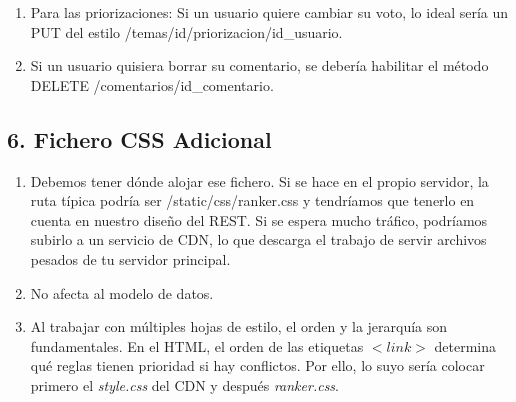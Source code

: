 \begin{enumerate}
  \item Para las priorizaciones: Si un usuario quiere cambiar su voto, lo ideal sería un PUT del estilo /temas/{id}/priorizacion/{id\_usuario}.
  \item Si un usuario quisiera borrar su comentario, se debería habilitar el método DELETE /comentarios/{id\_comentario}.
\end{enumerate}


\subsection*{6. Fichero CSS Adicional}

\begin{enumerate}
  \item Debemos tener dónde alojar ese fichero. Si se hace en el propio servidor, la ruta típica podría ser /static/css/ranker.css y tendríamos que tenerlo en cuenta en nuestro diseño del REST. Si se espera mucho tráfico, podríamos subirlo a un servicio de CDN, lo que descarga el trabajo de servir archivos pesados de tu servidor principal.
  \item No afecta al modelo de datos.
  \item Al trabajar con múltiples hojas de estilo, el orden y la jerarquía son fundamentales. 
En el HTML, el orden de las etiquetas $<link>$ determina qué reglas tienen prioridad si hay conflictos. Por ello, lo suyo sería colocar primero el \emph{style.css} del CDN y después \emph{ranker.css}.
\end{enumerate}

